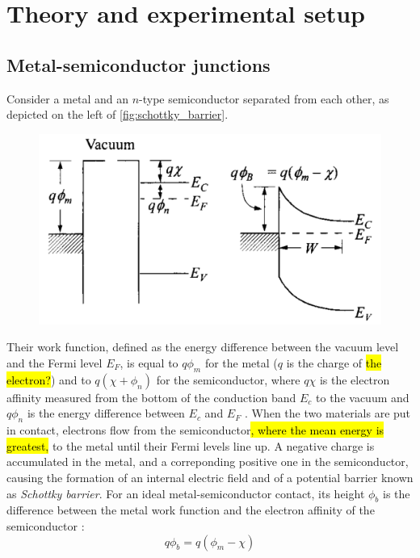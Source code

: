 \section{Theory and experimental setup}
\subsection{Metal-semiconductor junctions}
Consider a metal and an $n$-type semiconductor separated from each other, as depicted on the left of \autoref{fig:schottky_barrier}.
\begin{figure}[htbp]
    \centering
    \includegraphics[width=12cm]{figures/schottky_barrier.png}
    \caption{}
    \label{fig:schottky_barrier}
\end{figure}
Their work function, defined as the energy difference between the vacuum level and the Fermi level $E_F$, is equal to $q \phi_m$ for the metal ($q$ is the charge of \hl{the electron?}) and to $q (\chi + \phi_n)$ for the semiconductor, where $q \chi$ is the electron affinity measured from the bottom of the conduction band $E_c$ to the vacuum and $q\phi_n$ is the energy difference between $E_c$ and $E_F$ \cite{sze_physics_2007}.
When the two materials are put in contact, electrons flow from the semiconductor\hl{, where the mean energy is greatest,} to the metal until their Fermi levels line up.
A negative charge is accumulated in the metal, and a correponding positive one in the semiconductor, causing the formation of an internal electric field and of a potential barrier known as \emph{Schottky barrier}.
For an ideal metal-semiconductor contact, its height $\phi_b$ is the difference between the metal work function and the electron affinity of the semiconductor \cite{sze_physics_2007}:
\begin{equation} \label{eq:barrier_height}
    q\phi_b = q(\phi_m - \chi)
\end{equation}

